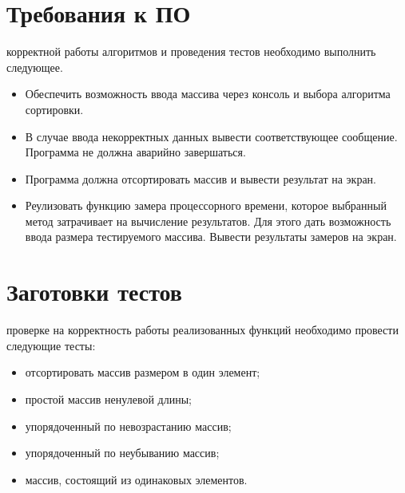 \section{Требования к ПО}
 корректной работы алгоритмов и проведения тестов необходимо выполнить следующее.
\begin{itemize}
	\item Обеспечить возможность ввода массива через консоль и выбора алгоритма сортировки.
	\item В случае ввода некорректных данных вывести соответствующее сообщение. Программа не должна аварийно завершаться.
	\item Программа должна отсортировать массив и вывести результат на экран.
	\item Реулизовать функцию замера процессорного времени, которое выбранный метод затрачивает на вычисление результатов. Для этого дать возможность ввода размера тестируемого массива. Вывести результаты замеров на экран.
\end{itemize}

\section{Заготовки тестов}
 проверке на корректность работы реализованных функций необходимо провести следующие тесты:
\begin{itemize}
	\item отсортировать массив размером в один элемент;
	\item простой массив ненулевой длины;
	\item упорядоченный по невозрастанию массив;
	\item упорядоченный по неубыванию массив;
	\item массив, состоящий из одинаковых элементов.
\end{itemize}

